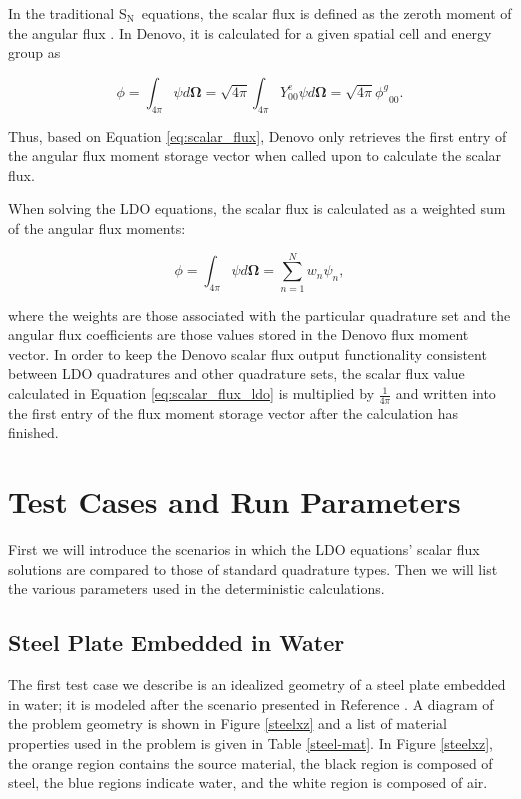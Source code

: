 \documentclass{article} %
\newcommand{\bo}{\mathbf\Omega}
\newcommand{\sn}{S$_\mathrm{N}$}
\newcommand{\even}{\ensuremath{\phi^g}}
\begin{document}
In the traditional \sn\ equations, the scalar flux is
defined as the zeroth moment of the angular flux \cite{exmm}. In Denovo, it is
calculated for a given spatial cell and energy group as

\begin{equation}
\phi = \int_{4\pi}\psi d\bo = \sqrt{4\pi}\int_{4\pi}Y_{00}^{e}\psi d\bo
     = \sqrt{4\pi}\even_{00}.
\label{eq:scalar_flux}
\end{equation}

\noindent Thus, based on Equation \ref{eq:scalar_flux}, Denovo only retrieves
the first entry of the angular flux moment storage vector when called upon to
calculate the scalar flux.

When solving the LDO equations, the scalar flux is calculated as a 
weighted sum of the angular flux moments:

\begin{equation}
\phi = \int_{4\pi}\psi d\bo = \sum_{n=1}^{N}w_n\psi_n,
\label{eq:scalar_flux_ldo}
\end{equation}

\noindent where the weights are those associated with the particular quadrature
set and the angular flux coefficients are those values stored in the Denovo
flux moment vector. In order to keep the Denovo scalar flux output 
functionality consistent between LDO quadratures and other quadrature sets, the
scalar flux value calculated in Equation \ref{eq:scalar_flux_ldo} is multiplied
by $\tfrac{1}{4\pi}$ and written into the first entry of the flux moment
storage vector after the calculation has finished.

\section{Test Cases and Run Parameters}

First we will introduce the scenarios in which the LDO equations' scalar flux
solutions are compared to those of standard quadrature types. Then we will list
the various parameters used in the deterministic calculations.

\subsection{Steel Plate Embedded in Water}

The first test case we describe is an idealized geometry of a steel plate 
embedded in water; it is modeled after the scenario presented in Reference 
\cite{wilsonslaybaugh}. 
A diagram of the problem geometry is shown in Figure \ref{steelxz} and a list
of material properties used in the problem is given in Table \ref{steel-mat}.
In Figure \ref{steelxz}, the orange region contains the source material, the 
black region is composed of steel, the blue regions indicate water, and the 
white region is composed of air.
\end{document}
